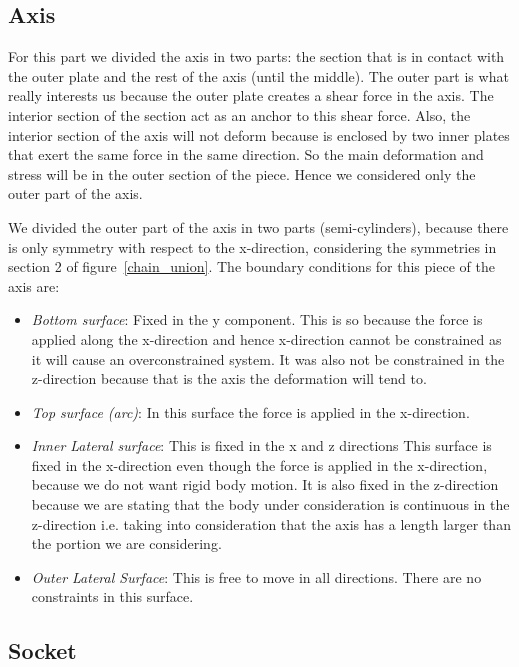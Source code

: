 \documentclass[a4paper 12pt]{article}
\begin{document}
\subsection{Axis}

For this part we divided the axis in two parts: the section that is in contact with the outer plate and the rest of the axis (until the middle). The outer part is what really interests us because the outer plate creates a shear force in the axis. The interior section of the section act as an anchor to this shear force. Also, the interior section of the axis will not deform because is enclosed by two inner plates that exert the same force in the same direction. So the main deformation and stress will be in the outer section of the piece. Hence we considered only the outer part of the axis.

We divided the outer part of the axis in two parts (semi-cylinders), because there is only symmetry with respect to the x-direction, considering the symmetries in section 2 of figure~\ref{chain_union}. The boundary conditions for this piece of the axis are:

\begin{itemize}
\item \textit{Bottom surface}: Fixed in the y component. This is so because the force is applied along the x-direction and hence x-direction cannot be constrained as it will cause an overconstrained system. It was also not be constrained in the z-direction because that is the axis the deformation will tend to.

\item \textit{Top surface (arc)}: In this surface the force is applied in the x-direction.

\item \textit{Inner Lateral surface}: This is fixed in the x and z directions
This surface is fixed in the x-direction even though the force is applied in the x-direction, because we do not want rigid body motion. It is also fixed in the z-direction because we are stating that the body under consideration is continuous in the z-direction i.e. taking into consideration that the axis has a length larger than the portion we are considering.

\item \textit{Outer Lateral Surface}: This is free to move in all directions. There are no constraints in this surface.

\end{itemize}

\subsection{Socket}
\end{document}
